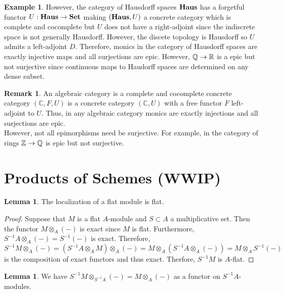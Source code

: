 \documentclass[12pt]{extarticle}
\newcommand{\Z}{\mathbb{Z}}
\newcommand{\R}{\mathbb{R}}
\newcommand{\Set}{\mathbf{Set}}
\theoremstyle{definition}
\newtheorem{lemma}[theorem]{Lemma}
\newtheorem{example}[theorem]{Example}
\newtheorem{remark}{Remark}
\newcommand{\C}{\mathbb{C}}
\begin{document}
\begin{example}
However, the category of Hausdorff spaces $\mathbf{Haus}$ has a forgetful functor $U : \Haus \to \Set$ making $(\mathbf{Haus}, U)$ a concrete category which is complete and cocomplete but $U$ does not have a right-adjoint since the indiscrete space is not generally Hausdorff. However, the discete topology is Hausdorff so $U$ admits a left-adjoint $D$. Therefore, monics in the category of Hausdorff spaces are exactly injective maps and all surjections are epic. However, $\Q \to \R$ is a epic but not surjective since continuous maps to Haudorff spaces are determined on any dense subset. 
\end{example}

\begin{remark}
An algebraic category is a complete and cocomplete concrete category $(\C, F, U)$ is a concrete category $(\C, U)$ with a free functor $F$ left-adjoint to $U$. Thus, in any algebraic category monics are exactly injections and all surjections are epic.
\bigskip\\
However, not all epimorphisms need be surjective. For example, in the category of rings $\Z \to \Q$ is epic but not surjective. 
\end{remark}

\section{Products of Schemes (WWIP)}

\newcommand{\Ass}[2]{\mathrm{Ass}_{#1} \left( #2 \right)}

\begin{lemma}
The localization of a flat module is flat.
\end{lemma}

\begin{proof}
Suppose that $M$ is a flat $A$-module and $S \subset A$ a multiplicative set. Then the functor $M \otimes_A (-)$ is exact since $M$ is flat. Furthermore, $S^{-1} A \otimes_A (-) = S^{-1}(-)$ is exact. Therefore,
\[ S^{-1} M \otimes_A (-) = (S^{-1} A \otimes_A M) \otimes_A (-) = M \otimes_A (S^{-1} A \otimes_A (-)) = M \otimes_A S^{-1}(-) \]
is the composition of exact functors and thus exact. Therfore, $S^{-1} M$ is $A$-flat. 
\end{proof}

\begin{lemma}
We have $S^{-1} M \otimes_{S^{-1} A} (-) = M \otimes_A (-)$ as a functor on $S^{-1}A$-modules. 
\end{lemma}
\end{document}

